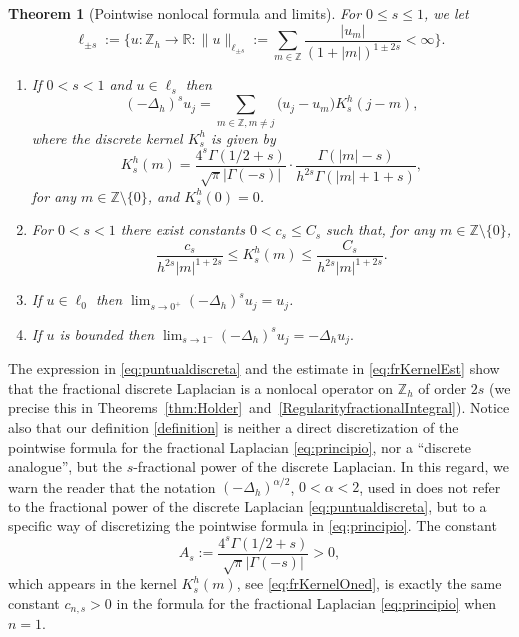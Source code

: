 \documentclass[a4paper,11pt,reqno]{amsart}
\newcommand{\R}{\mathbb{R}}
\newcommand{\Z}{\mathbb{Z}}
\newtheorem{thm}{Theorem}[section]
\theoremstyle{definition}
\numberwithin{equation}{section}
\begin{document}
\begin{thm}[Pointwise nonlocal formula and limits]
\label{thm:basicProperties}
For $0\leq s\leq1$, we let
\begin{equation}
\label{ls}
\ell_{\pm s} := \Big\{u:\Z_h\to\R: \|u\|_{\ell_{\pm s}} 
:= \sum_{m\in \Z} \frac{|u_{m}|}{(1+|m|)^{1 \pm 2s}}<\infty\Big\}.
\end{equation}
\begin{enumerate}[$(a)$]
\item \label{aa} If $0<s<1$ and $u\in\ell_{s}$ then
\begin{equation}
\label{eq:puntualdiscreta}
(-\Delta_h)^su_{j} = \sum_{m\in\Z,m\neq j}
\big(u_{j}-u_{m}\big) K^h_s(j-m),
\end{equation}
where the discrete kernel $K^h_s$ is given by
\begin{equation}
\label{eq:frKernelOned}
K^h_s(m)=\frac{4^s\Gamma(1/2+s)}{\sqrt{\pi}|\Gamma(-s)|}\cdot\frac{\Gamma(|m|-s)}{h^{2s}\Gamma(|m|+1+s)},
\end{equation}
for any $m\in\Z\setminus\{0\}$, and $K_s^h(0)=0$.
\item \label{cc} For $0<s<1$ there exist constants $0<c_s\leq C_s$ such that, for any $m\in\Z\setminus\{0\}$,
\begin{equation}
\label{eq:frKernelEst}
\frac{c_s}{h^{2s}|m|^{1+2s}}\leq K^h_s(m) \leq \frac{C_{s}}{h^{2s}|m|^{1+2s}}.
\end{equation}
\item \label{bb} If $u\in\ell_{0}$ then
$\displaystyle \lim_{s\to0^+}(-\Delta_h)^su_{j}=u_{j}$.
\item  If $u$ is bounded then
$\displaystyle \lim_{s\to1^-}(-\Delta_h)^su_{j}=-\Delta_hu_{j}.$
\end{enumerate}
\end{thm}

The expression in \eqref{eq:puntualdiscreta} and the estimate in \eqref{eq:frKernelEst} show that
the fractional discrete Laplacian is a nonlocal operator on $\Z_h$ of order $2s$
(we precise this in Theorems~\ref{thm:Holder}~and~\ref{RegularityfractionalIntegral}).
Notice also that our definition \eqref{definition} is neither
a direct discretization of the pointwise formula for the fractional Laplacian \eqref{eq:principio}, nor
a ``discrete analogue'', but the $s$-fractional power of the discrete Laplacian.
In this regard, we warn the reader that the notation $(-\Delta_h)^{\alpha/2}$, $0<\alpha<2$,
used in \cite{Huang-Oberman}
does not refer to the fractional power of the discrete Laplacian \eqref{eq:puntualdiscreta}, but
to a specific way of discretizing the pointwise formula in \eqref{eq:principio}.
The constant
\begin{equation}
\label{eq:constante1d}
A_{s} := \frac{4^s\Gamma(1/2+s)}{\sqrt{\pi}|\Gamma(-s)|}>0,
\end{equation}
which appears in the kernel $K_s^h(m)$, see \eqref{eq:frKernelOned},
is exactly the same constant $c_{n,s}>0$ in the formula for
the fractional Laplacian \eqref{eq:principio} when $n=1$.
\end{document}
